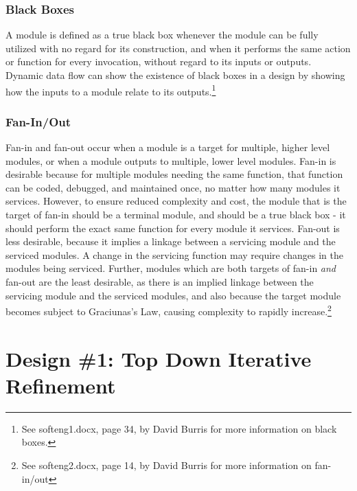 \documentclass{article}
\begin{document}
		\subsubsection{Black Boxes}
			A module is defined as a true black box whenever the module can be fully utilized with no regard for its construction, and when it performs the same action or function for every invocation, without regard to its inputs or outputs. Dynamic data flow can show the existence of black boxes in a design by showing how the inputs to a module relate to its outputs.\footnote{See softeng1.docx, page 34, by David Burris for more information on black boxes.} 
		\subsubsection{Fan-In/Out}
			Fan-in and fan-out occur when a module is a target for multiple, higher level modules, or when a module outputs to multiple, lower level modules. Fan-in is desirable because for multiple modules needing the same function, that function can be coded, debugged, and maintained once, no matter how many modules it services. However, to ensure reduced complexity and cost, the module that is the target of fan-in should be a terminal module, and should be a true black box - it should perform the exact same function for every module it services. Fan-out is less desirable, because it implies a linkage between a servicing module and the serviced modules. A change in the servicing function may require changes in the modules being serviced. Further, modules which are both targets of fan-in \emph{and} fan-out are the least desirable, as there is an implied linkage between the servicing module and the serviced modules, and also because the target module becomes subject to Graciunas's Law, causing complexity to rapidly increase.\footnote{See softeng2.docx, page 14, by David Burris for more information on fan-in/out} 

%
%
\section{Design \#1: Top Down Iterative Refinement}
\end{document}
